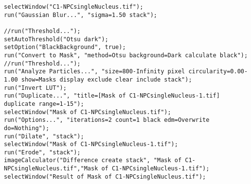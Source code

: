 \begin{lstlisting}
selectWindow("C1-NPCsingleNucleus.tif");
run("Gaussian Blur...", "sigma=1.50 stack");

//run("Threshold...");
setAutoThreshold("Otsu dark");
setOption("BlackBackground", true);
run("Convert to Mask", "method=Otsu background=Dark calculate black");
//run("Threshold...");
run("Analyze Particles...", "size=800-Infinity pixel circularity=0.00-1.00 show=Masks display exclude clear include stack");
run("Invert LUT");
run("Duplicate...", "title=[Mask of C1-NPCsingleNucleus-1.tif] duplicate range=1-15");
selectWindow("Mask of C1-NPCsingleNucleus.tif");
run("Options...", "iterations=2 count=1 black edm=Overwrite do=Nothing");
run("Dilate", "stack");
selectWindow("Mask of C1-NPCsingleNucleus-1.tif");
run("Erode", "stack");
imageCalculator("Difference create stack", "Mask of C1-NPCsingleNucleus.tif","Mask of C1-NPCsingleNucleus-1.tif");
selectWindow("Result of Mask of C1-NPCsingleNucleus.tif");


\end{lstlisting}